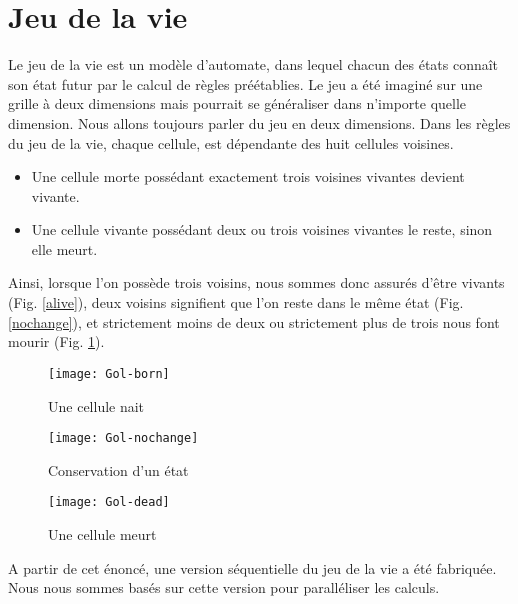 \section{Jeu de la vie} %
\label{sec:jeu_de_la_vie}

Le jeu de la vie est un modèle d'automate, dans lequel chacun des états connaît son état futur par le calcul de règles préétablies. Le jeu a été imaginé sur une grille à deux dimensions mais pourrait se généraliser dans n'importe quelle dimension. Nous allons toujours parler du jeu en deux dimensions. Dans les règles du jeu de la vie, chaque cellule, est dépendante des huit cellules voisines.
\begin{itemize}
\item Une cellule morte possédant exactement trois voisines vivantes devient vivante.
\item Une cellule vivante possédant deux ou trois voisines vivantes le reste, sinon elle meurt.
\end{itemize}

Ainsi, lorsque l'on possède trois voisins, nous sommes donc assurés d'être vivants (Fig. \ref{alive}), deux voisins signifient que l'on reste dans le même état (Fig. \ref{nochange}), et strictement moins de deux ou strictement plus de trois nous font mourir (Fig. \ref{dead}).

\begin{figure}[!ht]
\centering
\begin{minipage}{.3\textwidth}
\centering
\texttt{[image: Gol-born]}
\caption{Une cellule nait}
\label{alive}
\end{minipage}
\hspace{0.5cm}
\begin{minipage}{0.3\textwidth}
\centering
\texttt{[image: Gol-nochange]}
\caption{Conservation d'un état}
\label{nochange}
\end{minipage}
\hspace{0.5cm}
\begin{minipage}{.3\textwidth}
\centering
\texttt{[image: Gol-dead]}
\caption{Une cellule meurt}
\label{dead}
\end{minipage}
\end{figure}

A partir de cet énoncé, une version séquentielle du jeu de la vie a été fabriquée. Nous nous sommes basés sur cette version pour paralléliser les calculs.

